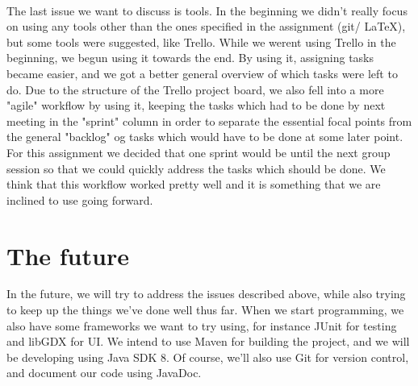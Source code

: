 \documentclass{article}
\begin{document}
\noindent \\
The last issue we want to discuss is tools. In the beginning we didn't really focus on using any tools other than the ones specified in the assignment (git/ LaTeX), but some tools were suggested, like Trello. While we werent using Trello in the beginning, we begun using it towards the end. By using it, assigning tasks became easier, and we got a better general overview of which tasks were left to do. Due to the structure of the Trello project board, we also fell into a more "agile" workflow by using it, keeping the tasks which had to be done by next meeting in the "sprint" column in order to separate the essential focal points from the general "backlog" og tasks which would have to be done at some later point. For this assignment we decided that one sprint would be until the next group session so that we could quickly address the tasks which should be done. We think that this workflow worked pretty well and it is something that we are inclined to use going forward.

\newpage
\section*{The future}

In the future, we will try to address the issues described above, while also trying to keep up the things we've done well thus far. When we start programming, we also have some frameworks we want to try using, for instance JUnit for testing and libGDX for UI. We intend to use Maven for building the project, and we will be developing using Java SDK 8. Of course, we'll also use Git for version control, and document our code using JavaDoc.
\end{document}
